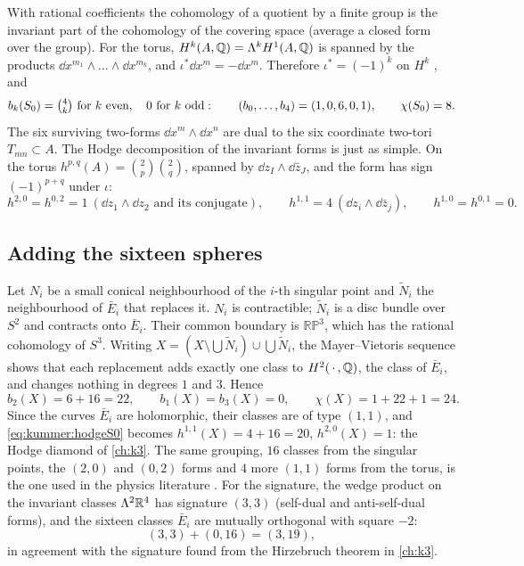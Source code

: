 With rational coefficients the cohomology of a quotient by a finite group is the invariant
part of the cohomology of the covering space (average a closed form over the group). For the
torus, $H^k(A,\mathbb{Q})=\Lambda^kH^1(A,\mathbb{Q})$ is spanned by the products
$\dd x^{m_1}\wedge\dots\wedge\dd x^{m_k}$, and $\iota^*\dd x^m=-\dd x^m$. Therefore
$\iota^*=(-1)^k$ on $H^k$ , and
\begin{equation}\label{eq:kummer:bettiS0}
  b_k(S_0)=\tbinom4k\ \text{for $k$ even},\quad 0\ \text{for $k$ odd}:
  \qquad (b_0,\dots,b_4)=(1,0,6,0,1),\qquad \chi(S_0)=8 .
\end{equation}
The six surviving two-forms $\dd x^m\wedge\dd x^n$ are dual to the six coordinate two-tori
$T_{mn}\subset A$. The Hodge decomposition of the invariant forms is just as simple. On the
torus $h^{p,q}(A)=\binom2p\binom2q$, spanned by
$\dd z_I\wedge\dd\bar z_J$, and the form has sign $(-1)^{p+q}$ under $\iota$:
\begin{equation}\label{eq:kummer:hodgeS0}
  h^{2,0}=h^{0,2}=1\ (\dd z_1\wedge\dd z_2\text{ and its conjugate}),\qquad
  h^{1,1}=4\ (\dd z_i\wedge\dd\bar z_j),\qquad h^{1,0}=h^{0,1}=0 .
\end{equation}

\subsection{Adding the sixteen spheres}

Let $N_i$ be a small conical neighbourhood of the $i$-th singular point and $\tilde N_i$ the
neighbourhood of $\bar E_i$ that replaces it. $N_i$ is contractible; $\tilde N_i$ is a disc
bundle over $S^2$ and contracts onto $\bar E_i$. Their common boundary is $\mathbb{RP}^3$,
which has the rational cohomology of $S^3$. Writing $X=(X\setminus\bigcup\tilde
N_i)\cup\bigcup\tilde N_i$, the Mayer--Vietoris sequence shows that each replacement adds
exactly one class to $H^2(\,\cdot\,,\mathbb{Q})$, the class of $\bar E_i$, and changes nothing in
degrees $1$ and $3$. Hence
\begin{equation}\label{eq:kummer:b2}
  b_2(X)=6+16=22,\qquad b_1(X)=b_3(X)=0,\qquad \chi(X)=1+22+1=24 .
\end{equation}
Since the curves $\bar E_i$ are holomorphic, their classes are of type $(1,1)$, and
\eqref{eq:kummer:hodgeS0} becomes $h^{1,1}(X)=4+16=20$, $h^{2,0}(X)=1$: the Hodge diamond of
\cref{ch:k3}. The same grouping, $16$ classes from the singular points, the $(2,0)$ and
$(0,2)$ forms and $4$ more $(1,1)$ forms from the torus, is the one used in the physics
literature . For the signature, the wedge product on the
invariant classes $\Lambda^2\mathbb{R}^4$ has signature $(3,3)$ (self-dual and anti-self-dual forms),
and the sixteen classes $\bar E_i$ are mutually orthogonal with square $-2$:
\begin{equation}\label{eq:kummer:signature}
  (3,3)+(0,16)=(3,19),
\end{equation}
in agreement with the signature found from the Hirzebruch theorem in \cref{ch:k3}.

